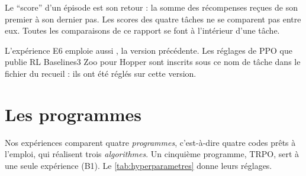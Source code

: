 Le \enquote{score} d'un épisode est son retour : la somme des récompenses reçues de son premier à son dernier
pas. Les scores des quatre tâches ne se comparent pas entre eux. Toutes les comparaisons de ce rapport se font
à l'intérieur d'une tâche.

L'expérience E6 emploie aussi , la version précédente. Les réglages de PPO que publie RL
Baselines3 Zoo pour Hopper sont inscrits sous ce nom de tâche dans le fichier  du
recueil : ils ont été réglés sur cette version.

\section{Les programmes}\label{sec:programmes}

Nos expériences comparent quatre \emph{programmes}, c'est-à-dire quatre codes prêts à l'emploi, qui réalisent
trois \emph{algorithmes}. Un cinquième programme, TRPO, sert à une seule expérience (B1). Le
\cref{tab:hyperparametres} donne leurs réglages.


